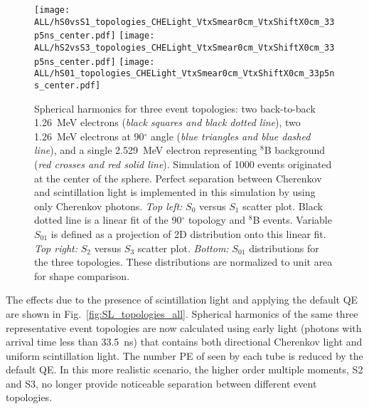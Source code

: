 \begin{figure*}[h]
  \centering
  \texttt{[image: ALL/hS0vsS1\_topologies\_CHELight\_VtxSmear0cm\_VtxShiftX0cm\_33p5ns\_center.pdf]}
  \texttt{[image: ALL/hS2vsS3\_topologies\_CHELight\_VtxSmear0cm\_VtxShiftX0cm\_33p5ns\_center.pdf]}
  \texttt{[image: ALL/hS01\_topologies\_CHELight\_VtxSmear0cm\_VtxShiftX0cm\_33p5ns\_center.pdf]}
  \caption{Spherical harmonics for three event topologies: two
    back-to-back 1.26~MeV electrons (\emph{black squares and black
      dotted line}), two 1.26~MeV electrons at 90$^{\circ}$ angle
    (\emph{blue triangles and blue dashed line}), and a single
    2.529~MeV electron representing $^{8}$B background (\emph{red
      crosses and red solid line}). Simulation of 1000 events
    originated at the center of the sphere. Perfect separation between
    Cherenkov and scintillation light is implemented in this
    simulation by using only Cherenkov photons. \emph{Top left:} $S_0$
    versus $S_1$ scatter plot. Black dotted line is a linear fit of
    the 90$^{\circ}$ topology and $^{8}$B events. Variable $S_{01}$ is
    defined as a projection of 2D distribution onto this linear
    fit. \emph{Top right:} $S_2$ versus $S_3$ scatter
    plot. \emph{Bottom:} $S_{01}$ distributions for the three
    topologies. These distributions are normalized to unit area for
    shape comparison.}
  \label{fig:SL_topologies_CHE}
\end{figure*}


The effects due to the presence of scintillation light and applying the default QE are shown in Fig.~\ref{fig:SL_topologies_all}. Spherical harmonics of the same three representative event topologies are now calculated using early light (photons with arrival time less than 33.5~ns) that contains both directional Cherenkov light and uniform scintillation light. The number PE of seen by each tube is reduced by the default QE. In this more realistic scenario, the higher order multiple moments, S2 and S3, no longer provide noticeable separation between different event topologies.


